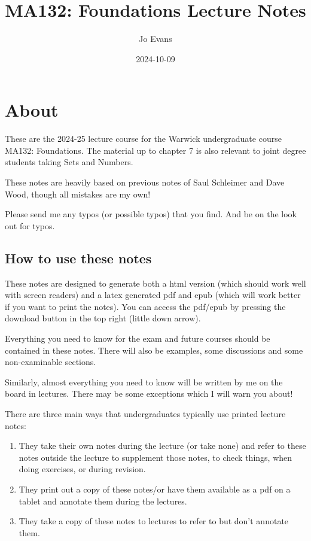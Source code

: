 \documentclass[
]{book}
\title{MA132: Foundations Lecture Notes}
\author{Jo Evans}
\date{2024-10-09}
\theoremstyle{definition}
\theoremstyle{definition}
\theoremstyle{definition}
\theoremstyle{definition}
\theoremstyle{remark}
\begin{document}
\maketitle

{
\setcounter{tocdepth}{1}
\tableofcontents
}
\chapter{About}\label{about}

These are the 2024-25 lecture course for the Warwick undergraduate course MA132: Foundations. The material up to chapter 7 is also relevant to joint degree students taking Sets and Numbers.

These notes are heavily based on previous notes of Saul Schleimer and Dave Wood, though all mistakes are my own!

Please send me any typos (or possible typos) that you find. And be on the look out for typos.

\section{How to use these notes}\label{how-to-use-these-notes}

These notes are designed to generate both a html version (which should work well with screen readers) and a latex generated pdf and epub (which will work better if you want to print the notes). You can access the pdf/epub by pressing the download button in the top right (little down arrow).

Everything you need to know for the exam and future courses should be contained in these notes. There will also be examples, some discussions and some non-examinable sections.

Similarly, almost everything you need to know will be written by me on the board in lectures. There may be some exceptions which I will warn you about!

There are three main ways that undergraduates typically use printed lecture notes:

\begin{enumerate}
\def\labelenumi{\arabic{enumi}.}
\item
  They take their own notes during the lecture (or take none) and refer to these notes outside the lecture to supplement those notes, to check things, when doing exercises, or during revision.
\item
  They print out a copy of these notes/or have them available as a pdf on a tablet and annotate them during the lectures.
\item
  They take a copy of these notes to lectures to refer to but don't annotate them.
\end{enumerate}
\end{document}
